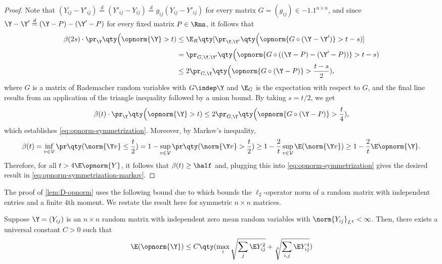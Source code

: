 \documentclass[10pt]{article}
\begin{document}
\begin{proof}
    Note that $(Y_{ij} - Y'_{ij}) \stackrel{d}{=} (Y'_{ij} - Y_{ij}) \stackrel{d}{=} g_{ij} (Y_{ij} - Y'_{ij})$ for every matrix $G = (g_{ij}) \in \qty{-1, +1}^{n \times n}$, and since $\Y - \Y' \stackrel{d}{=} (\Y - P) - (\Y' - P)$ for every fixed matrix $P \in \Rnn$, it follows that
    \begin{align}
        \beta(2s) \cdot \pr_\Y\qty\Big( \opnorm{\Y} > t ) 
        &\le \E_{R}\qty[\pr_{\Y, \Y'}\qty\Big( \opnorm{G \circ (\Y - \Y')} > t-s  )]\\
        &= \pr_{G,\Y, \Y'}\qty\Big( \opnorm{G \circ ((\Y - P)-(\Y' - P))} > t-s  )\\
        &\le 2\pr_{G,\Y}\qty\Big( \opnorm{G \circ (\Y - P)} > \frac{t-s}{2}  ),
    \end{align}
    where $G$ is a matrix of \iid{} Rademacher random variables with $G \indep \Y$ and $\E_{G}$ is the expectation with respect to $G$, and the final line results from an application of the triangle inequality followed by a union bound. By taking $s = t/2$, we get
    \begin{align}
        \beta(t) \cdot \pr_\Y\qty\Big( \opnorm{\Y} > t ) \le 2\pr_{G, \Y}\qty\Big( \opnorm{G \circ (\Y - P)} > \frac{t}{4}  ),
    \end{align}
    which establishes \cref{eq:opnorm-symmetrization}. Moreover, by Markov's inequality,
    \begin{align}
        \beta(t) = \inf_{v \in \cal{V}}\pr\qty( \norm{\Y v} \le \frac{t}{2} ) = 1 - \sup_{v \in \cal{V}}\pr\qty( \norm{\Y v} > \frac{t}{2} ) \ge 1 - \frac{2}{t}\sup_{v \in \cal{V}}\E(\norm{\Y v}) \ge 1 - \frac{2}{t}\E\opnorm{\Y}.
    \end{align}
    Therefore, for all $t > 4\E\opnorm{Y}$, it follows that $\beta(t) \ge \half$ and, plugging this into \cref{eq:opnorm-symmetrization} gives the desired result in \cref{eq:opnorm-symmetrization-markov}.
\end{proof}







The proof of \cref{lem:D-opnorm} uses the following bound due to \cite{latala2005some} which bounds the $\ell_2$-operator norm of a random matrix with independent entries and a finite $4$th moment. We restate the result here for symmetric $n \times n$ matrices. 

\begin{proposition}\label{prop:latala}
    Suppose $\Y = (Y_{ij})$ is an $n \times n$ random matrix with independent zero mean random variables with $\norm{Y_{ij}}_{L^4} < \infty$. Then, there exists a universal constant $C > 0$ such that
    \begin{align}
        \E(\opnorm{\Y}) \le C \qty( \max_{i}\sqrt{\sum_{j}\E Y_{ij}^2} + \sqrt[4]{\sum_{i, j}\E Y_{ij}^4} )
    \end{align}
\end{proposition}
\end{document}
